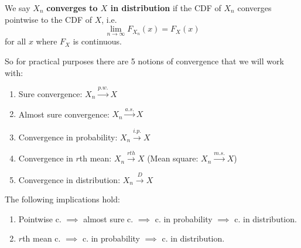 \documentclass{article}
\begin{document}
    \begin{definition}
      We say $X_n$ \textbf{converges to $X$ in distribution} if the CDF of $X_n$ converges pointwise to the CDF of $X$, i.e. 
      \begin{equation}
        \lim_{n \rightarrow \infty} F_{X_n} (x) = F_X (x)
      \end{equation}
      for all $x$ where $F_{X}$ is continuous. 
    \end{definition}

    So for practical purposes there are 5 notions of convergence that we will work with: 
    \begin{enumerate}
        \item Sure convergence: $X_n \xrightarrow{p.w.} X$ 
        \item Almost sure convergence: $X_n \xrightarrow{a.s.} X$ 
        \item Convergence in probability: $X_n \xrightarrow{i.p.} X$ 
        \item Convergence in $r$th mean: $X_n \xrightarrow{rth} X$ (Mean square: $X_n \xrightarrow{m.s.} X$) 
        \item Convergence in distribution: $X_n \xrightarrow{D} X$
    \end{enumerate}

    \begin{theorem}
      The following implications hold: 
      \begin{enumerate}
        \item Pointwise c. $\implies$ almost sure c. $\implies$ c. in probability $\implies$ c. in distribution. 
        \item $r$th mean c. $\implies$ c. in probability $\implies$ c. in distribution. 
      \end{enumerate}
    \end{theorem}
\end{document}
